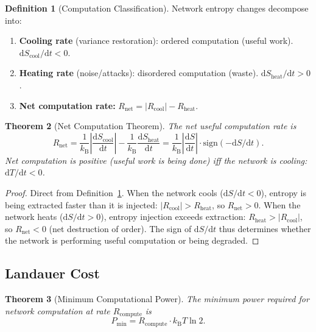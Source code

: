 \documentclass[11pt,twocolumn,a4paper]{article}
\newtheorem{theorem}{Theorem}[section]
\theoremstyle{definition}
\newtheorem{definition}[theorem]{Definition}
\newcommand{\kB}{k_{\mathrm{B}}}
\newcommand{\dif}{\mathrm{d}}
\begin{document}
\begin{definition}[Computation Classification]\label{def:computation_class}
Network entropy changes decompose into:
\begin{enumerate}[label=(\roman*)]
  \item \textbf{Cooling rate} (variance restoration): ordered computation (useful work).
        $\dif S_{\mathrm{cool}}/\dif t < 0$.
  \item \textbf{Heating rate} (noise/attacks): disordered computation (waste).
        $\dif S_{\mathrm{heat}}/\dif t > 0$.
  \item \textbf{Net computation rate:}
        $R_{\mathrm{net}} = |R_{\mathrm{cool}}| - R_{\mathrm{heat}}$.
\end{enumerate}
\end{definition}

\begin{theorem}[Net Computation Theorem]\label{thm:net_computation}
The net useful computation rate is
\begin{equation}\label{eq:net_computation}
  R_{\mathrm{net}} = \frac{1}{\kB}\left|\frac{\dif S_{\mathrm{cool}}}{\dif t}\right|
  - \frac{1}{\kB}\frac{\dif S_{\mathrm{heat}}}{\dif t}
  = \frac{1}{\kB}\left|\frac{\dif S}{\dif t}\right| \cdot \mathrm{sign}(-\dif S/\dif t).
\end{equation}
Net computation is positive (useful work is being done) iff the network is cooling:
$\dif T/\dif t < 0$.
\end{theorem}

\begin{proof}
Direct from Definition~\ref{def:computation_class}. When the network cools
($\dif S/\dif t < 0$), entropy is being extracted faster than it is injected:
$|R_{\mathrm{cool}}| > R_{\mathrm{heat}}$, so $R_{\mathrm{net}} > 0$. When the network
heats ($\dif S/\dif t > 0$), entropy injection exceeds extraction:
$R_{\mathrm{heat}} > |R_{\mathrm{cool}}|$, so $R_{\mathrm{net}} < 0$ (net destruction
of order). The sign of $\dif S/\dif t$ thus determines whether the network is performing
useful computation or being degraded.
\end{proof}

\subsection{Landauer Cost}\label{sec:ep:landauer}

\begin{theorem}[Minimum Computational Power]\label{thm:landauer_power}
The minimum power required for network computation at rate $R_{\mathrm{compute}}$ is
\begin{equation}\label{eq:landauer_power}
  P_{\min} = R_{\mathrm{compute}} \cdot \kB T \ln 2.
\end{equation}
\end{theorem}
\end{document}
